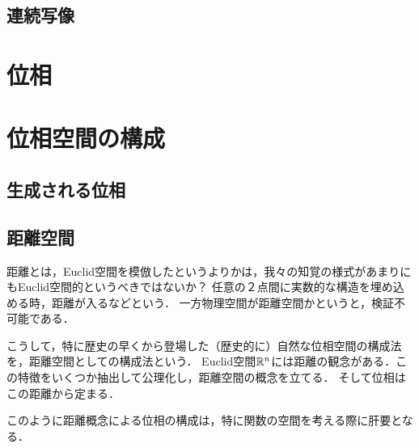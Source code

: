 \documentclass[uplatex,dvipdfmx]{jsreport}
\begin{document}
\section{連続写像}



\chapter{位相}

\chapter{位相空間の構成}

\section{生成される位相}

\section{距離空間}

\begin{screen}
    距離とは，Euclid空間を模倣したというよりかは，我々の知覚の様式があまりにもEuclid空間的というべきではないか？
    任意の２点間に実数的な構造を埋め込める時，距離が入るなどという．
    一方物理空間が距離空間かというと，検証不可能である．

    こうして，特に歴史の早くから登場した（歴史的に）自然な位相空間の構成法を，距離空間としての構成法という．
    Euclid空間$\mathbb{R}^n$には距離の観念がある．この特徴をいくつか抽出して公理化し，距離空間の概念を立てる．
    そして位相はこの距離から定まる．

    このように距離概念による位相の構成は，特に関数の空間を考える際に肝要となる．
\end{screen}
\end{document}
